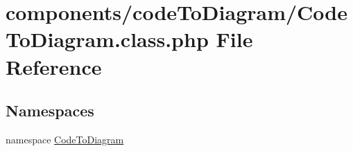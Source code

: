 \hypertarget{_code_to_diagram_8class_8php}{
\section{components/codeToDiagram/CodeToDiagram.class.php File Reference}
\label{_code_to_diagram_8class_8php}
}
\subsection*{Namespaces}
\begin{CompactItemize}
\item 
namespace \hyperlink{namespace_code_to_diagram}{CodeToDiagram}
\end{CompactItemize}
